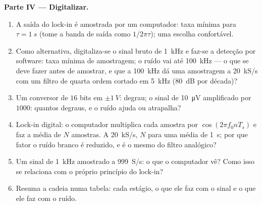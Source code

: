 \begin{problem}
\medskip
\noindent\textbf{Parte IV --- Digitalizar.}
\begin{enumerate}[resume]
  \item A saída do lock-in é amostrada por um computador: taxa mínima para
        $\tau = \qty{1}{s}$ (tome a banda de saída como $1/2\pi\tau$); uma
        escolha confortável.
  \item Como alternativa, digitaliza-se o sinal bruto de \qty{1}{kHz} e faz-se a
        detecção por software: taxa mínima de amostragem; o ruído
        vai até \qty{100}{kHz} --- o que se deve fazer antes de amostrar,
        e que  a \qty{100}{kHz} dá uma amostragem a
        \qty{20}{kS/s} com um filtro de quarta ordem cortado em \qty{5}{kHz}
        (\qty{80}{dB} por década)?
  \item Um conversor de $16$ bits em $\pm\qty{1}{V}$: degrau; o sinal de \qty{10}{\micro V}
        amplificado por $1000$: quantos degraus, e o ruído
        ajuda ou atrapalha?
  \item Lock-in digital: o computador multiplica cada amostra por
        $\cos(2\pi f_0nT_s)$ e faz a média de $N$ amostras. A \qty{20}{kS/s},
        $N$ para uma média de \qty{1}{s}; por que fator o ruído branco é
        reduzido, e é o mesmo do filtro analógico?
  \item Um sinal de \qty{1}{kHz} amostrado a \qty{999}{S/s}: o que o
        computador vê? Como isso se relaciona com o próprio princípio do
        lock-in?
  \item Resuma a cadeia numa tabela: cada estágio, o que ele faz com o
        sinal e o que ele faz com o ruído.
\end{enumerate}
\end{problem}
